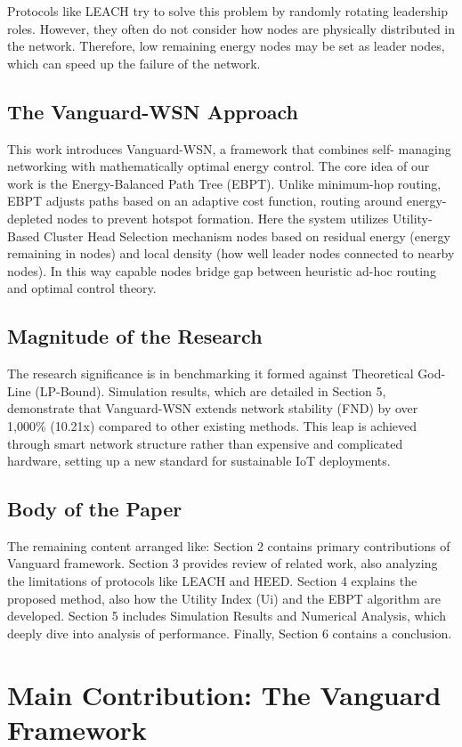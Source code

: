 \documentclass[conference]{IEEEtran}
\begin{document}
Protocols like LEACH try to solve this problem by randomly rotating leadership roles. However, they often do not consider how nodes are physically distributed in the network. Therefore, low remaining energy nodes may be set as leader nodes, which can speed up the failure of the network.

\subsection{The Vanguard-WSN Approach}
This work introduces Vanguard-WSN, a framework that combines self- managing networking with mathematically optimal energy control. The core idea of our work is the Energy-Balanced Path Tree (EBPT). Unlike minimum-hop routing, EBPT adjusts paths based on an adaptive cost function, routing around energy-depleted nodes to prevent hotspot formation.
Here the system utilizes Utility-Based Cluster Head Selection mechanism nodes based on residual energy (energy remaining in nodes) and local density (how well leader nodes connected to nearby nodes). In this way capable nodes bridge gap between heuristic ad-hoc routing and optimal control theory.

\subsection{Magnitude of the Research}
The research significance is in benchmarking it formed against Theoretical God-Line (LP-Bound). Simulation results, which are detailed in Section 5, demonstrate that Vanguard-WSN extends network stability (FND) by over 1,000\% (10.21x) compared to other existing methods. This leap is achieved through smart network structure rather than expensive and complicated hardware, setting up a new standard for sustainable IoT deployments.

\subsection{Body of the Paper}
The remaining content arranged like: Section 2 contains primary contributions of Vanguard framework. Section 3 provides review of related work, also analyzing the limitations of protocols like LEACH and HEED. Section 4 explains the proposed method, also how the Utility Index (Ui) and the EBPT algorithm are developed. Section 5 includes Simulation Results and Numerical Analysis, which deeply dive into analysis of performance. Finally, Section 6 contains a conclusion.

\section{Main Contribution: The Vanguard Framework}
\end{document}
